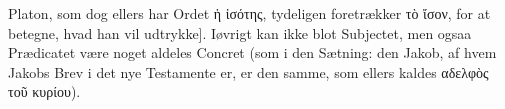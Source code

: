 \documentclass[12pt]{book}
\def\textit#1{#1}%
\def\emph#1{#1}%
\newcommand{\opage}[1]{\marginnote{\footnotesize\textit{[#1]}}}
\begin{document}
\opage{253} Platon, som dog ellers har Ordet \textit{ἡ ἰσότης}, tydeligen foretrækker
\textit{τὸ ἴσον}, for at betegne, hvad han vil udtrykke]. Iøvrigt kan ikke blot
\emph{Subjectet}, men ogsaa \emph{Prædicatet} være noget aldeles Concret (som i den
Sætning: den Jakob, af hvem Jakobs Brev i det nye Testamente er, er den samme, som
ellers kaldes \textit{αδελφὸς τοῦ κυρίου}).
\end{document}
